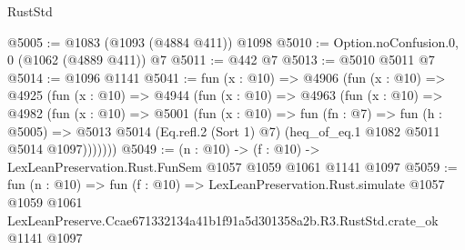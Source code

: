 \begin{lexlean}{RustStd}
\begin{coremodule}
@5005 := @1083 (@1093 (@4884 @411)) @1098
@5010 := Option.noConfusion.{0, 0} (@1062 (@4889 @411)) @7
@5011 := @442 @7
@5013 := @5010 @5011 @7
@5014 := @1096 @1141
@5041 := fun (x : @10) =>
  @4906
    (fun (x : @10) =>
    @4925
      (fun (x : @10) =>
      @4944
        (fun (x : @10) =>
        @4963
          (fun (x : @10) =>
          @4982
            (fun (x : @10) =>
            @5001
              (fun (x : @10) =>
              fun (fn : @7) =>
              fun (h : @5005) =>
              @5013 @5014 (Eq.refl.{2} (Sort 1) @7) (heq_of_eq.{1} @1082 @5011 @5014 @1097)))))))
@5049 := (n : @10) -> (f : @10) -> LexLeanPreservation.Rust.FunSem @1057 @1059 @1061 @1141 @1097
@5059 := fun (n : @10) =>
  fun (f : @10) =>
  LexLeanPreservation.Rust.simulate
    @1057
    @1059
    @1061
    LexLeanPreserve.Ccae671332134a41b1f91a5d301358a2b.R3.RustStd.crate_ok
    @1141
    @1097
\end{coremodule}
\end{lexlean}
